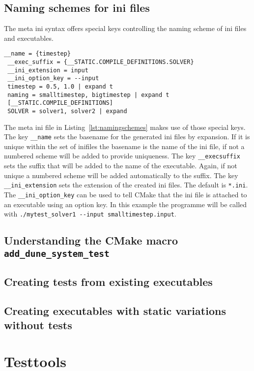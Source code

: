 \documentclass[11pt]{article}
\begin{document}
\subsection{Naming schemes for ini files}
\label{sec:namingschemes}
The meta ini syntax offers special keys controlling the naming scheme of ini files and executables.
\begin{lstlisting}[caption={Meta ini file using the special keys for setting the naming scheme},label=lst:namingschemes]
 __name = {timestep}
 __exec_suffix = {__STATIC.COMPILE_DEFINITIONS.SOLVER}
 __ini_extension = input
 __ini_option_key = --input
 timestep = 0.5, 1.0 | expand t
 naming = smalltimestep, bigtimestep | expand t
 [__STATIC.COMPILE_DEFINITIONS]
 SOLVER = solver1, solver2 | expand
\end{lstlisting}
The meta ini file in Listing~\ref{lst:namingschemes} makes use of those special keys. The key \lstinline!__name! sets the basename for the
generated ini files by expansion. If it is unique within the set of inifiles the basename is the name of the ini file, if not a numbered scheme
will be added to provide uniqueness. The key \lstinline!__execsuffix! sets the suffix that will be added to the name of the executable. Again,
if not unique a numbered scheme will be added automatically to the suffix. The key \lstinline!__ini_extension! sets the extension of the created
ini files. The default is \lstinline!*.ini!. The \lstinline!__ini_option_key! can be used to tell CMake that the ini file is attached to an
executable using an option key. In this example the programme will be called with \lstinline!./mytest_solver1 --input smalltimestep.input!.

\subsection{Understanding the CMake macro \lstinline!add_dune_system_test!}

\subsection{Creating tests from existing executables}
\subsection{Creating executables with static variations without tests}

\section{Testtools}
\label{sec:testtools}
\end{document}
